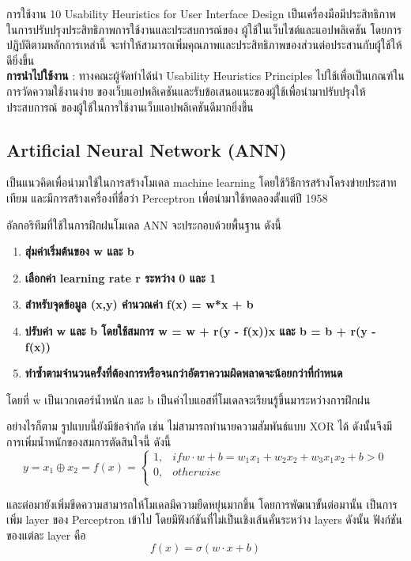 \par การใช้งาน 10 Usability Heuristics for User Interface Design
เป็นเครื่องมือมีประสิทธิภาพในการปรับปรุงประสิทธิภาพการใช้งานและประสบการณ์ของ
ผู้ใช้ในเว็บไซต์และแอปพลิเคชัน โดยการปฏิบัติตามหลักการเหล่านี้
จะทำให้สามารถเพิ่มคุณภาพและประสิทธิภาพของส่วนต่อประสานกับผู้ใช้ให้ดียิ่งขึ้น \\
\textbf{การนำไปใช้งาน} : ทางคณะผู้จัดทำได้นำ
Usability Heuristics Principles ไปใช้เพื่อเป็นเกณฑ์ในการวัดความใช้งานง่าย
ของเว็บแอปพลิเคชันและรับข้อเสนอแนะของผู้ใช้เพื่อนำมาปรับปรุงให้ประสบการณ์
ของผู้ใช้ในการใช้งานเว็บแอปพลิเคชันดีมากยิ่งขึ้น

\subsection{Artificial Neural Network (ANN)}
เป็นแนวคิดเพื่อนำมาใช้ในการสร้างโมเดล machine learning โดยใช้วิธีการสร้างโครงข่ายประสาทเทียม
และมีการสร้างเครื่องที่ชื่อว่า Perceptron เพื่อนำมาใช้ทดลองตั้งแต่ปี 1958

อัลกอริทึมที่ใช้ในการฝึกฝนโมเดล ANN จะประกอบด้วยพื้นฐาน ดังนี้
\begin{enumerate}
      \item \textbf{สุ่มค่าเริ่มต้นของ w และ b}
      \item \textbf{เลือกค่า learning rate r ระหว่าง 0 และ 1}
      \item \textbf{สำหรับจุดข้อมูล (x,y) คำนวณค่า f(x) = w*x + b}
      \item \textbf{ปรับค่า w และ b โดยใช้สมการ w = w + r(y - f(x))x และ b = b + r(y - f(x))}
      \item \textbf{ทำซ้ำตามจำนวนครั้งที่ต้องการหรือจนกว่าอัตราความผิดพลาดจะน้อยกว่าที่กำหนด}
\end{enumerate}
โดยที่ w เป็นเวกเตอร์น้ำหนัก และ b เป็นค่าไบแอสที่โมเดลจะเรียนรู้ขึ้นมาระหว่างการฝึกฝน

อย่างไรก็ตาม รูปแบบนี้ยังมีข้อจำกัด เช่น ไม่สามารถทำนายความสัมพันธ์แบบ XOR ได้ ดังนั้นจึงมีการเพิ่มน้ำหนักของสมการตัดสินใจนี้ ดังนี้
\[
      y=x_{1}\oplus x_{2}=f(x)=
      \begin{cases}
            1, & if w \cdot w + b = w_{1}x_{1} + w_{2}x_{2} + w_{3}x_{1}x_{2} + b > 0 \\
            0, & otherwise                                                            \\
      \end{cases}
\]

และต่อมายังเพิ่มขีดความสามารถให้โมเดลมีความยืดหยุ่นมากขึ้น โดยการพัฒนาขั้นต่อมานั้น เป็นการเพิ่ม layer ของ Perceptron เข้าไป โดยมีฟังก์ชันที่ไม่เป็นเชิงเส้นคั่นระหว่าง layers ดังนั้น ฟังก์ชันของแต่ละ layer คือ
\[f(x)=\sigma(w \cdot x + b)\]

